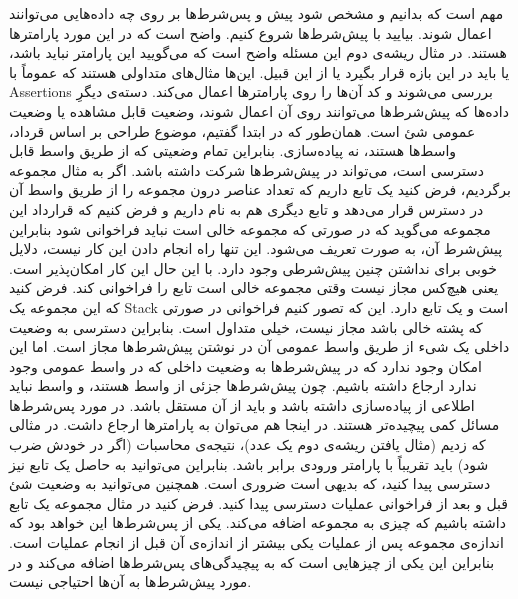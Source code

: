 مهم است که بدانیم و مشخص شود پیش و پس‌شرط‌ها بر روی چه داده‌هایی می‌توانند اعمال شوند. بیایید با پیش‌شرط‌ها شروع کنیم. واضح است که در این مورد پارامترها هستند. در مثال ریشه‌ی دوم این مسئله واضح است که می‌گویید این پارامتر نباید 
باشد، یا باید در این بازه قرار بگیرد یا از این قبیل. این‌ها مثال‌های متداولی هستند که عموماً با 
\glspl{Assertion}
بررسی می‌شوند و کد آن‌ها را روی پارامترها اعمال می‌کند. دسته‌ی دیگرِ داده‌ها که پیش‌شرط‌ها می‌توانند روی آن اعمال شوند، وضعیت قابل مشاهده یا وضعیت عمومی شئ است. همان‌طور که در ابتدا گفتیم، موضوع طراحی بر اساس قرداد، واسط‌ها هستند، نه پیاده‌سازی. بنابراین تمام وضعیتی که از طریق واسط قابل دسترسی است، می‌تواند در پیش‌شرط‌ها شرکت داشته باشد. اگر به مثال مجموعه برگردیم، فرض کنید یک تابع 
داریم که تعداد عناصر درون مجموعه را از طریق واسط آن در دسترس قرار می‌دهد و تابع دیگری هم به نام
داریم و فرض کنیم که قرارداد این مجموعه می‌گوید که در صورتی که مجموعه خالی است
نباید فراخوانی شود بنابراین پیش‌شرط آن، به صورت
تعریف می‌شود. این تنها راه انجام دادن این کار نیست، دلایل خوبی برای نداشتن چنین پیش‌شرطی وجود دارد. با این حال این کار امکان‌پذیر است. یعنی هیچ‌کس مجاز نیست وقتی مجموعه خالی است تابع
را فراخوانی کند. فرض کنید که این مجموعه یک
\gls{Stack}
است و یک تابع
دارد. این که تصور کنیم فراخوانی
در صورتی که پشته خالی باشد مجاز نیست، خیلی متداول است. بنابراین دسترسی به وضعیت داخلی یک شیء از طریق واسط عمومی آن در نوشتن پیش‌شرط‌ها مجاز است. اما این امکان وجود ندارد که در پیش‌شرط‌ها به وضعیت داخلی که در واسط عمومی وجود ندارد ارجاع داشته باشیم. چون پیش‌شرط‌ها جزئی از واسط هستند، و واسط نباید اطلاعی از پیاده‌سازی داشته باشد و باید از آن مستقل باشد.
در مورد پس‌شرط‌ها مسائل کمی پیچیده‌تر هستند. در اینجا هم می‌توان به پارامترها ارجاع داشت. در مثالی که زدیم (مثال یافتن ریشه‌ی دوم یک عدد)، نتیجه‌ی محاسبات (اگر در خودش ضرب شود) باید تقریباً با پارامتر ورودی برابر باشد. بنابراین می‌توانید به حاصل یک تابع نیز دسترسی پیدا کنید، که بدیهی است ضروری است. همچنین می‌توانید به وضعیت شئ قبل و بعد از فراخوانی عملیات دسترسی پیدا کنید. فرض کنید در مثال مجموعه یک تابع
داشته باشیم که چیزی به مجموعه اضافه می‌کند. یکی از پس‌شرط‌ها این خواهد بود که اندازه‌ی مجموعه پس از عملیات یکی بیشتر از اندازه‌ی آن قبل از انجام عملیات است. بنابراین این یکی از چیزهایی است که به پیچیدگی‌های پس‌شرط‌ها اضافه می‌کند و در مورد پیش‌شرط‌ها به آن‌ها احتیاجی نیست.
\cite{arno2020}
